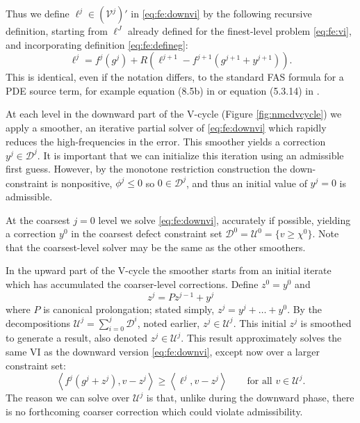 \documentclass[letterpaper,final,12pt,reqno]{amsart}
\theoremstyle{cstyle}
\theoremstyle{cstyle*}
\theoremstyle{dstyle}
\numberwithin{equation}{section}
\numberwithin{figure}{section}
\numberwithin{table}{section}
\numberwithin{theorem}{section}
\newcommand{\ip}[2]{\left<#1,#2\right>}
\begin{document}
Thus we define $\ell^j \in (\mathcal{V}^j)'$ in \eqref{eq:fe:downvi} by the following recursive definition, starting from $\ell^J$ already defined for the finest-level problem \eqref{eq:fe:vi}, and incorporating definition \eqref{eq:fe:defineg}:
\begin{equation}
\ell^j = f^j(g^j) + R\left(\ell^{j+1}-f^{j+1}(g^{j+1}+y^{j+1})\right). \label{eq:fe:levelsource}
\end{equation}
This is identical, even if the notation differs, to the standard FAS formula for a PDE source term, for example equation (8.5b) in \cite{BrandtLivne2011} or equation (5.3.14) in \cite{Trottenbergetal2001}.

At each level in the downward part of the V-cycle (Figure \ref{fig:nmcdvcycle}) we apply a smoother, an iterative partial solver of \eqref{eq:fe:downvi} which rapidly reduces the high-frequencies in the error.  This smoother yields a correction $y^j \in \mathcal{D}^j$.  It is important that we can initialize this iteration using an admissible first guess.  However, by the monotone restriction construction the down-constraint is nonpositive, $\phi^j\le 0$ so $0\in \mathcal{D}^j$, and thus an initial value of $y^j=0$ is admissible.

At the coarsest $j=0$ level we solve \eqref{eq:fe:downvi}, accurately if possible, yielding a correction $y^0$ in the coarsest defect constraint set $\mathcal{D}^0=\mathcal{U}^0 = \{v \ge \chi^0\}$.  Note that the coarsest-level solver may be the same as the other smoothers.

In the upward part of the V-cycle the smoother starts from an initial iterate which has accumulated the coarser-level corrections.  Define $z^0 = y^0$ and
\begin{equation}
z^j = P z^{j-1} + y^j  \label{eq:fe:upwardaccumulation}
\end{equation}
where $P$ is canonical prolongation; stated simply, $z^j = y^j + \dots + y^0$.  By the decompositions $\mathcal{U}^j = \sum_{i=0}^j \mathcal{D}^i$, noted earlier, $z^j \in \mathcal{U}^j$.  This initial $z^j$ is smoothed to generate a result, also denoted $z^j \in \mathcal{U}^j$.  This result approximately solves the same VI as the downward version \eqref{eq:fe:downvi}, except now over a larger constraint set:
\begin{equation}
\ip{f^j(g^j + z^j)}{v-z^j} \ge \ip{\ell^j}{v-z^j} \qquad \text{for all } v\in \mathcal{U}^j. \label{eq:fe:upvi}
\end{equation}
The reason we can solve over $\mathcal{U}^j$ is that, unlike during the downward phase, there is no forthcoming coarser correction which could violate admissibility.
\end{document}
